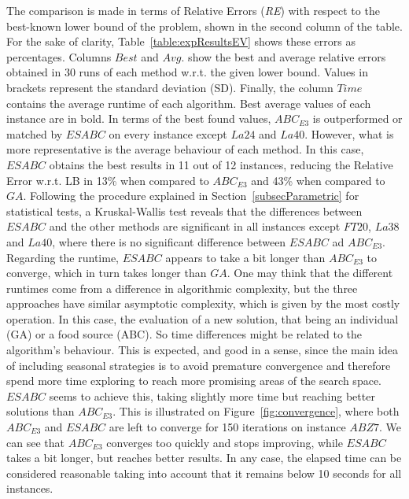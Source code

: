\documentclass[icae]{iosart2x}
\newcommand{\reviewed}[1]{#1} %
\begin{document}
\reviewed{The comparison is made in terms of Relative Errors (\textit{RE}) with respect to the best-known lower bound of the problem, shown in the second column of the table. For the sake of clarity, Table~\ref{table:expResultsEV} shows these errors as percentages. } Columns $Best$ and $Avg.$ show the best and average relative errors obtained in 30 runs of each method w.r.t. the given lower bound. \reviewed{Values in brackets represent the standard deviation (SD).} Finally, the column $Time$ contains the average runtime of each algorithm. Best average values of each instance are in bold.
In terms of the best found values, $ABC_{E3}$ is outperformed or matched by $ESABC$ on every instance except $La24$ and $La40$. However, what is more representative is the average behaviour of each method. In this case, $ESABC$ obtains the best results in 11 out of 12 instances, reducing the Relative Error w.r.t. LB in 13\% when compared to $ABC_{E3}$ and 43\% when compared to $GA$. \reviewed{Following the procedure explained in Section~\ref{subsecParametric} for statistical tests, a} Kruskal-Wallis test reveals that the differences between $ESABC$ and the other methods are significant in all instances except $FT20$, $La38$ and $La40$, where there is no significant difference between $ESABC$ ad $ABC_{E3}$. Regarding the runtime, $ESABC$ appears to take a bit longer than $ABC_{E3}$ to converge, which in turn takes longer than $GA$. \reviewed{One may think that the different runtimes come from a difference in algorithmic complexity, but the three approaches have similar asymptotic complexity, which is given by the most costly operation. In this case, the evaluation of a new solution, that being an individual (GA) or a food source (ABC). So time differences might be related to the algorithm's behaviour.} This is expected, and good in a sense, since the main idea of including seasonal strategies is to avoid premature convergence and therefore spend more time exploring to reach more promising areas of the search space. $ESABC$ seems to achieve this, taking slightly more time but reaching better solutions than $ABC_{E3}$. This is illustrated on Figure~\ref{fig:convergence}, where both $ABC_{E3}$ and $ESABC$ are left to converge for 150 iterations on instance $ABZ7$. We can see that $ABC_{E3}$ converges too quickly and stops improving, while $ESABC$ takes a bit longer, but reaches better results. In any case, the elapsed time can be considered reasonable taking into account that it remains below 10 seconds for all instances.
\end{document}
